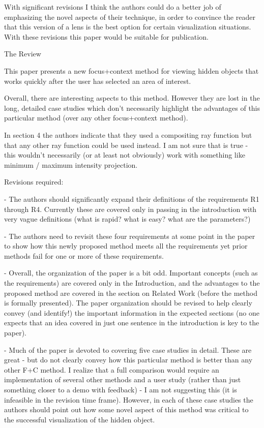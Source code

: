 \documentclass[a4paper,10pt]{article}
\begin{document}
    With significant revisions I think the authors could do a better job of
    emphasizing the novel aspects of their technique, in order to convince the reader
    that this version of a lens is the best option for certain visualization
    situations. With these revisions this paper would be suitable for publication.

  The Review

    This paper presents a new focus+context method for viewing hidden objects that
    works quickly after the user has selected an area of interest.

    Overall, there are interesting aspects to this method. However they are lost in
    the long, detailed case studies which don't necessarily highlight the advantages
    of this particular method (over any other focus+context method).

    In section 4 the authors indicate that they used a compositing ray function but
    that any other ray function could be used instead. I am not sure that is true -
    this wouldn't necessarily (or at least not obviously) work with something like
    minimum / maximum intensity projection.


    Revisions required:

    - The authors should significantly expand their definitions of the requirements R1
    through R4. Currently these are covered only in passing in the introduction with
    very vague definitions (what is rapid? what is easy? what are the parameters?)

    - The authors need to revisit these four requirements at some point in the paper
    to show how this newly proposed method meets all the requirements yet prior
    methods fail for one or more of these requirements.

    - Overall, the organization of the paper is a bit odd. Important concepts (such as
    the requirements) are covered only in the Introduction, and the advantages to the
    proposed method are covered in the section on Related Work (before the method is
    formally presented).  The paper organization should be revised to help clearly
    convey (and identify!) the important information in the expected sections (no one
    expects that an idea covered in just one sentence in the introduction is key to
    the paper).

    - Much of the paper is devoted to covering five case studies in detail. These are
    great - but do not clearly convey how this particular method is better than any
    other F+C method. I realize that a full comparison would require an implementation
    of several other methods and a user study (rather than just something closer to a
    demo with feedback) - I am not suggesting this (it is infeasible in the revision
    time frame). However, in each of these case studies the authors should point out
    how some novel aspect of this method was critical to the successful visualization
    of the hidden object.
\end{document}
